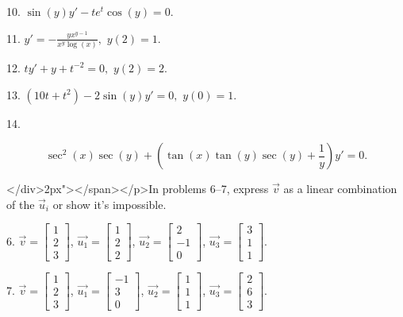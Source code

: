 \documentclass{article}
\begin{document}
10. $\displaystyle \sin(y)y' - te^t\cos(y) = 0.$

11. $\displaystyle y' = -\frac{yx^{y - 1}}{x^y\log(x)},$ $\displaystyle y(2) = 1.$

12. $\displaystyle ty' + y + t^{-2} = 0,$ $\displaystyle y(2) = 2.$

13. $\displaystyle (10t + t^2) - 2\sin(y)y' = 0,$ $\displaystyle y(0) = 1.$

14.

$$
	\sec^2(x)\sec(y) + \left( \tan(x) \tan(y) \sec(y) + \frac{1}{y} \right)y' = 0.
$$

</div>2px"></span></p>In problems 6--7, express $\vec{v}$ as a linear combination of the $\vec{u}_i$ or show it's impossible.

6. $\vec{v} = \left[\begin{array}{c} 1 \\ 2 \\ 3 \end{array}\right]$, $\vec{u_1} = \left[\begin{array}{c} 1 \\ 2 \\ 2 \end{array}\right]$, $\vec{u_2} = \left[\begin{array}{c} 2 \\ -1 \\ 0 \end{array}\right]$, $\vec{u_3} = \left[\begin{array}{c} 3 \\ 1 \\ 1 \end{array}\right]$.

7. $\vec{v} = \left[\begin{array}{c} 1 \\ 2 \\ 3 \end{array}\right]$, $\vec{u_1} = \left[\begin{array}{c} -1 \\ 3 \\ 0 \end{array}\right]$, $\vec{u_2} = \left[\begin{array}{c} 1 \\ 1 \\ 1 \end{array}\right]$, $\vec{u_3} = \left[\begin{array}{c} 2 \\ 6 \\ 3 \end{array}\right]$.
\end{document}
